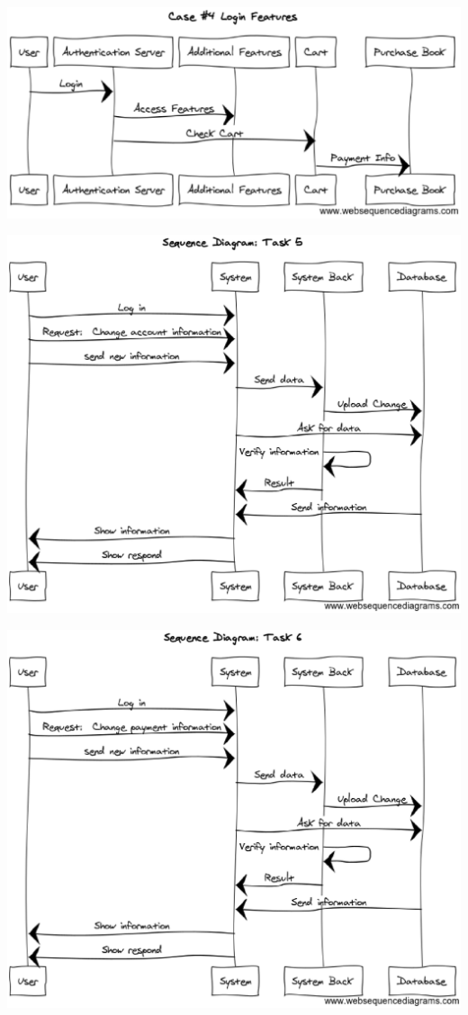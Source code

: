 \documentclass[12pt]{article}
\begin{document}
		\par
		\includegraphics[width=17cm]{story4.eps}
		\par
		\includegraphics[width=16cm]{story5.eps}
		\par
		\includegraphics[width=16cm]{story6.eps}
\end{document}
